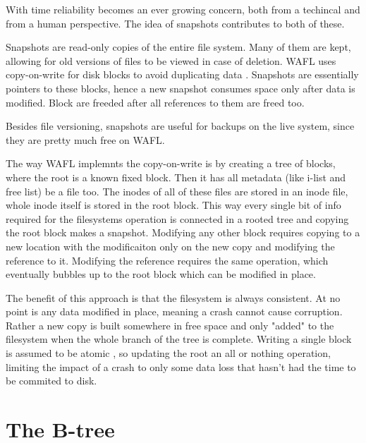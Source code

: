             With time reliability becomes an ever growing concern, both from a
            techincal and from a human perspective. The idea of snapshots
            contributes to both of these.

            Snapshots are read-only copies of the entire file system. Many of
            them are kept, allowing for old versions of files to be viewed in
            case of deletion. WAFL uses copy-on-write for disk blocks to avoid
            duplicating data \cite{WAFL}. Snapshots are essentially pointers to
            these blocks, hence a new snapshot consumes space only after data
            is modified. Block are freeded after all references to them are
            freed too.

            Besides file versioning, snapshots are useful for backups on the
            live system, since they are pretty much free on WAFL.


            The way WAFL implemnts the copy-on-write is by creating a tree of
            blocks, where the root is a known fixed block. Then it has all
            metadata (like i-list and free list) be a file too. The inodes of
            all of these files are stored in an inode file, whole inode itself
            is stored in the root block. This way every single bit of info
            required for the filesystems operation is connected in a rooted
            tree and copying the root block makes a snapshot. Modifying any
            other block requires copying to a new location with the
            modificaiton only on the new copy and modifying the reference to
            it. Modifying the reference requires the same operation, which
            eventually bubbles up to the root block which can be modified in
            place.

            The benefit of this approach is that the filesystem is always
            consistent. At no point is any data modified in place, meaning a
            crash cannot cause corruption. Rather a new copy is built somewhere
            in free space and only "added" to the filesystem when the whole
            branch of the tree is complete. Writing a single block is assumed
            to be atomic \cite{???}, so updating the root an all or nothing
            operation, limiting the impact of a crash to only some data loss
            that hasn't had the time to be commited to disk.


    \section{The B-tree}

